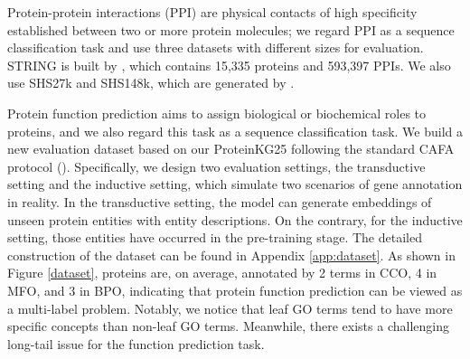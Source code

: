 Protein-protein interactions (PPI) are physical contacts of high specificity established between two or more protein molecules; we regard PPI as a sequence classification task and use three datasets with different sizes for evaluation. 
STRING is built by \cite{DBLP:conf/ijcai/LvHBZ21}, which contains 15,335 proteins and 593,397 PPIs.
We also use SHS27k and SHS148k, which are generated by \cite{DBLP:journals/bioinformatics/ChenJZCZCZW19}.

Protein function prediction aims to assign biological or biochemical roles to proteins, and we also regard this task as a sequence classification task.  
We build a new evaluation dataset based on our ProteinKG25 following the standard CAFA protocol (\cite{zhou2019cafa}). 
Specifically, we design two evaluation settings, the transductive setting and the inductive setting, which simulate two scenarios of gene annotation in reality. 
In the transductive setting, the model can generate embeddings of unseen protein entities with entity descriptions. 
On the contrary, for the inductive setting, those entities have occurred in the pre-training stage. 
The detailed construction of the dataset can be found in Appendix \ref{app:dataset}. 
As shown in Figure \ref{dataset}, proteins are, on average, annotated by 2 terms in CCO, 4 in MFO, and 3 in BPO, indicating that protein function prediction can be viewed as a multi-label problem.
{\color{highlight}
Notably, we notice that leaf GO terms tend to have  more specific concepts than non-leaf GO terms. 
Meanwhile, there exists a challenging long-tail issue for the function prediction task. 
}

 
